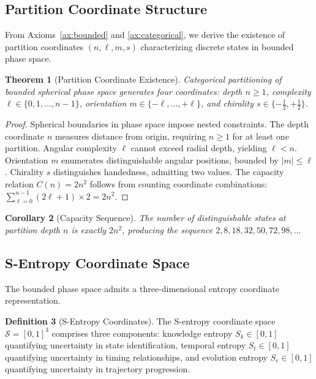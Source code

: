 \documentclass[12pt,a4paper]{article}
\theoremstyle{plain}
\newtheorem{theorem}{Theorem}[section]
\newtheorem{corollary}[theorem]{Corollary}
\theoremstyle{definition}
\newtheorem{definition}[theorem]{Definition}
\theoremstyle{remark}
\newcommand{\Sspace}{\mathcal{S}}
\newcommand{\Sk}{S_k}
\newcommand{\St}{S_t}
\newcommand{\Se}{S_e}
\begin{document}
\subsection{Partition Coordinate Structure}

From Axioms~\ref{ax:bounded} and \ref{ax:categorical}, we derive the existence of partition coordinates $(n,\ell,m,s)$ characterizing discrete states in bounded phase space.

\begin{theorem}[Partition Coordinate Existence]
\label{thm:partition_existence}
Categorical partitioning of bounded spherical phase space generates four coordinates: depth $n \geq 1$, complexity $\ell \in \{0,1,\ldots,n-1\}$, orientation $m \in \{-\ell,\ldots,+\ell\}$, and chirality $s \in \{-\tfrac{1}{2},+\tfrac{1}{2}\}$.
\end{theorem}

\begin{proof}
Spherical boundaries in phase space impose nested constraints. The depth coordinate $n$ measures distance from origin, requiring $n \geq 1$ for at least one partition. Angular complexity $\ell$ cannot exceed radial depth, yielding $\ell < n$. Orientation $m$ enumerates distinguishable angular positions, bounded by $|m| \leq \ell$. Chirality $s$ distinguishes handedness, admitting two values. The capacity relation $C(n) = 2n^2$ follows from counting coordinate combinations: $\sum_{\ell=0}^{n-1} (2\ell+1) \times 2 = 2n^2$.
\end{proof}

\begin{corollary}[Capacity Sequence]
The number of distinguishable states at partition depth $n$ is exactly $2n^2$, producing the sequence $2, 8, 18, 32, 50, 72, 98, \ldots$
\end{corollary}

\subsection{S-Entropy Coordinate Space}

The bounded phase space admits a three-dimensional entropy coordinate representation.

\begin{definition}[S-Entropy Coordinates]
\label{def:s_entropy}
The S-entropy coordinate space $\Sspace = [0,1]^3$ comprises three components: knowledge entropy $\Sk \in [0,1]$ quantifying uncertainty in state identification, temporal entropy $\St \in [0,1]$ quantifying uncertainty in timing relationships, and evolution entropy $\Se \in [0,1]$ quantifying uncertainty in trajectory progression.
\end{definition}
\end{document}

